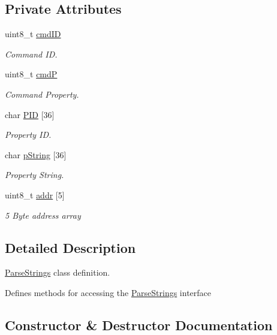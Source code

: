 \subsection*{Private Attributes}
\begin{DoxyCompactItemize}
\item 
uint8\+\_\+t \hyperlink{classParseStrings_a861e286994be25fad33c18c9be18ed12}{cmd\+ID}
\begin{DoxyCompactList}\small\item\em Command ID. \end{DoxyCompactList}\item 
uint8\+\_\+t \hyperlink{classParseStrings_abd72bf6aef85d0c8d2bc5e145695c7f9}{cmdP}
\begin{DoxyCompactList}\small\item\em Command Property. \end{DoxyCompactList}\item 
char \hyperlink{classParseStrings_a8a5bf86758a4cfaed5445aa9ad907afc}{P\+ID} \mbox{[}36\mbox{]}
\begin{DoxyCompactList}\small\item\em Property ID. \end{DoxyCompactList}\item 
char \hyperlink{classParseStrings_a89114cea60b7a37e80c799cec5bcd03d}{p\+String} \mbox{[}36\mbox{]}
\begin{DoxyCompactList}\small\item\em Property String. \end{DoxyCompactList}\item 
uint8\+\_\+t \hyperlink{classParseStrings_a0919816f131553dcd3706286e8bb61cc}{addr} \mbox{[}5\mbox{]}
\begin{DoxyCompactList}\small\item\em 5 Byte address array \end{DoxyCompactList}\end{DoxyCompactItemize}


\subsection{Detailed Description}
\hyperlink{classParseStrings}{Parse\+Strings} class definition. 

Defines methods for accessing the \hyperlink{classParseStrings}{Parse\+Strings} interface 

\subsection{Constructor \& Destructor Documentation}
